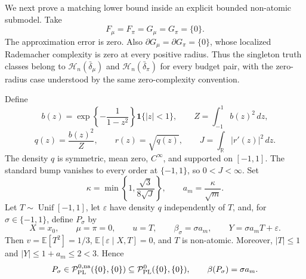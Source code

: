 We next prove a matching lower bound inside an explicit bounded non-atomic submodel. Take
\[
F_\mu=F_\pi=G_\mu=G_\pi=\{0\}.
\]
The approximation error is zero. Also \(\partial G_\mu=\partial G_\pi=\{0\}\), whose localized Rademacher complexity is zero at every positive radius. Thus the singleton truth classes belong to \(\mathcal H_n(\bar\delta_\mu)\) and \(\mathcal H_n(\bar\delta_\pi)\) for every budget pair, with the zero-radius case understood by the same zero-complexity convention.

Define
\[
b(z)=\exp\!\left\{-\frac{1}{1-z^2}\right\}\mathbf 1\{|z|<1\},\qquad Z=\int_{-1}^1b(z)^2\,dz,
\]
\[
q(z)=\frac{b(z)^2}{Z},\qquad r(z)=\sqrt{q(z)},\qquad J=\int_{\mathbb R}|r'(z)|^2\,dz.
\]
The density \(q\) is symmetric, mean zero, \(C^\infty\), and supported on \([-1,1]\). The standard bump vanishes to every order at \(\{-1,1\}\), so \(0<J<\infty\). Set
\[
\kappa=\min\left\{1,\frac{\sqrt3}{8\sqrt J}\right\},\qquad a_m=\frac{\kappa}{\sqrt m}.
\]
Let \(T\sim\operatorname{Unif}[-1,1]\), let \(\varepsilon\) have density \(q\) independently of \(T\), and, for \(\sigma\in\{-1,1\}\), define \(P_\sigma\) by
\[
X=x_0,\qquad \mu=\pi=0,\qquad u=T,\qquad \beta_\sigma=\sigma a_m,\qquad Y=\sigma a_mT+\varepsilon.
\]
Then \(v=\mathbb E[T^2]=1/3\), \(\mathbb E[\varepsilon\mid X,T]=0\), and \(T\) is non-atomic. Moreover, \(|T|\le1\) and \(|Y|\le1+a_m\le2<3\). Hence
\[
P_\sigma\in\mathcal P_{\rm PL}^{0,\rm na}(\{0\},\{0\})\subseteq\mathcal P_{\rm PL}^{0}(\{0\},\{0\}),\qquad \beta(P_\sigma)=\sigma a_m.
\]

